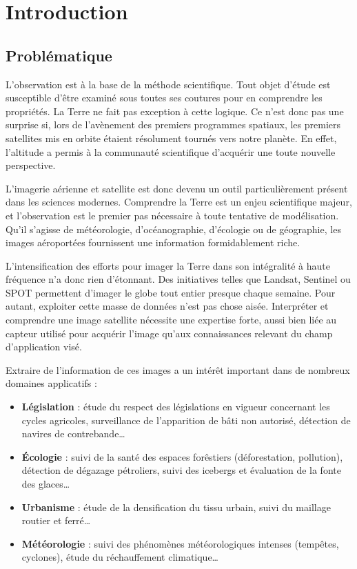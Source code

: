 \chapter{Introduction}
	\citationChap{}{}
	\minitoc
	\newpage


\section{Problématique}
L'observation est à la base de la méthode scientifique. Tout objet d'étude est susceptible d'être examiné sous toutes ses coutures pour en comprendre les propriétés. La Terre ne fait pas exception à cette logique. Ce n'est donc pas une surprise si, lors de l'avènement des premiers programmes spatiaux, les premiers satellites mis en orbite étaient résolument tournés vers notre planète. En effet, l'altitude a permis à la communauté scientifique d'acquérir une toute nouvelle perspective.

L'imagerie aérienne et satellite est donc devenu un outil particulièrement présent dans les sciences modernes. Comprendre la Terre est un enjeu scientifique majeur, et l'observation est le premier pas nécessaire à toute tentative de modélisation. Qu'il s'agisse de météorologie, d'océanographie, d'écologie ou de géographie, les images aéroportées fournissent une information formidablement riche.

L'intensification des efforts pour imager la Terre dans son intégralité à haute fréquence n'a donc rien d'étonnant. Des initiatives telles que Landsat, Sentinel ou SPOT permettent d'imager le globe tout entier presque chaque semaine. Pour autant, exploiter cette masse de données n'est pas chose aisée. Interpréter et comprendre une image satellite nécessite une expertise forte, aussi bien liée au capteur utilisé pour acquérir l'image qu'aux connaissances relevant du champ d'application visé.

Extraire de l'information de ces images a un intérêt important dans de nombreux domaines applicatifs :
\begin{itemize}
	\item \textbf{Législation} : étude du respect des législations en vigueur concernant les cycles agricoles, surveillance de l'apparition de bâti non autorisé, détection de navires de contrebande\dots
	\item \textbf{Écologie} : suivi de la santé des espaces forêstiers (déforestation, pollution), détection de dégazage pétroliers, suivi des icebergs et évaluation de la fonte des glaces\dots
	\item \textbf{Urbanisme} : étude de la densification du tissu urbain, suivi du maillage routier et ferré\dots
	\item \textbf{Météorologie} : suivi des phénomènes météorologiques intenses (tempêtes, cyclones), étude du réchauffement climatique\dots
\end{itemize}

